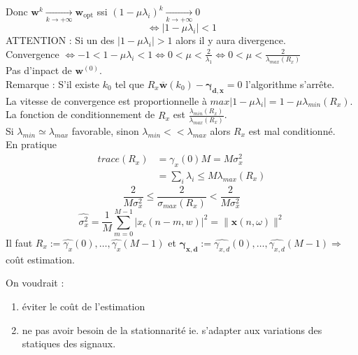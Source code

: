 \documentclass[12pt]{article}
\begin{document}
Donc $\mathbf{w}^{k} \underset{k \to +\infty}{\longrightarrow} \mathbf{w}_{\text{opt}}$ ssi $(1 - \mu \lambda_i)^k \underset{k \to +\infty}{\longrightarrow} 0 $
$$\Leftrightarrow |1- \mu \lambda_i|< 1$$
ATTENTION : Si un des $|1- \mu \lambda_i|> 1$ alors il y aura divergence.\\
Convergence $\Leftrightarrow -1 <1 - \mu \lambda_i < 1 \Leftrightarrow 0< \mu < \frac{2}{\lambda_1} \Leftrightarrow \boxed{0 < \mu < \frac{2}{\lambda_{max}(R_x)}}$  \\
Pas d'inpact de $\mathbf{w}^{(0)}$.\\
Remarque : S'il existe $k_0$ tel que $R_x \mathbf{\overline{w}}(k_0) - \mathbf{\gamma_{d,x}}=0$ l'algorithme s'arrête.\\
La vitesse de convergence est proportionnelle à $max|1-\mu \lambda_i|= 1-\mu \lambda_{min}(R_x)$. La fonction de conditionnement de $R_x$ est $\frac{\lambda_{min}(R_x)}{\lambda_{max}(R_x)}$.\\
Si $\lambda_{min} \simeq \lambda_{max} $ favorable, sinon $\lambda_{min} << \lambda_{max} $ alors $R_x$ est mal conditionné.\\
En pratique 
\begin{align}
    trace(R_x) &= \gamma_x(0) M = M\sigma_x^2 \nonumber \\
    &= \sum_i \lambda_i \leq M \lambda_{max}(R_x)
\end{align}
$$\frac{2}{M\sigma_x^2} \leq \frac{2}{\sigma_{max}(R_x)} < \frac{2}{M\sigma_x^2} $$
$$\hat{\sigma_x^2} = \frac{1}{M} \sum_{m=0}^{M-1}|x_c(n-m,w)|^2 = \| \mathbf{x}(n,\omega) \|^2$$
Il faut $R_x := \hat{\gamma_x}(0), \dots ,\hat{\gamma_x}(M-1) $ et $ \mathbf{\gamma_{x,d}} := \hat{\gamma_{x,d}}(0), \dots ,\hat{\gamma_{x,d}}(M-1) \Rightarrow$ coût estimation.

On voudrait : 
\begin{enumerate}
    \item éviter le coût de l'estimation 
    \item ne pas avoir besoin de la stationnarité ie. s'adapter aux variations des statiques des signaux.
\end{enumerate}
\end{document}
